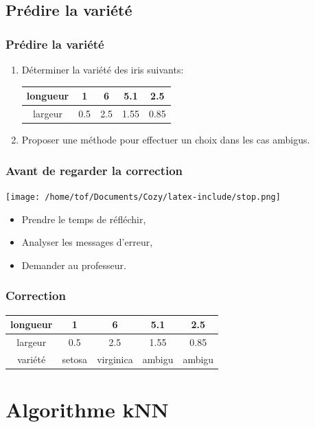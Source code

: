 \documentclass[svgnames,11pt]{beamer}
\begin{document}
\subsection{Prédire la variété}
\begin{frame}
    \frametitle{Prédire la variété}

\begin{activite}
\begin{enumerate}
    \item Déterminer la variété des iris suivants:
    \begin{tabular}{|*{5}{c|}}
        \hline
        longueur&1&6 &5.1 &2.5 \\
        \hline
        largeur&0.5&2.5& 1.55&0.85 \\
        \hline
    \end{tabular}
    \item Proposer une méthode pour effectuer un choix dans les cas ambigus.
\end{enumerate}
\end{activite}

\end{frame}
\begin{frame}
    \frametitle{Avant de regarder la correction}
\begin{center}
    \centering
    \texttt{[image: /home/tof/Documents/Cozy/latex-include/stop.png]}
    \end{center}
{\Large
    \begin{itemize}
        \item Prendre le temps de réfléchir,
        \item Analyser les messages d'erreur,
        \item Demander au professeur.
    \end{itemize}
}
\end{frame}
\begin{frame}
    \frametitle{Correction}
    \begin{tabular}{|*{5}{c|}}
        \hline
        longueur&1&6 &5.1 &2.5 \\
        \hline
        largeur&0.5&2.5& 1.55&0.85 \\
        \hline
        variété&setosa&virginica&ambigu&ambigu\\
        \hline
    \end{tabular}
    

\end{frame}
\section{Algorithme kNN}
\end{document}
